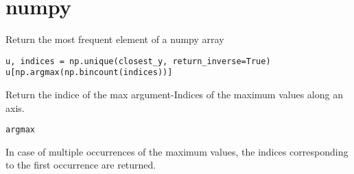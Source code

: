 \documentclass{article}           %
\begin{document}
\section{numpy}
Return the most frequent element of a numpy array
\begin{verbatim}
u, indices = np.unique(closest_y, return_inverse=True)
u[np.argmax(np.bincount(indices))]
\end{verbatim}
Return the indice of the max argument-Indices of the maximum values along an axis.
\begin{verbatim}
argmax
\end{verbatim}
In case  of multiple  occurrences of the  maximum values,  the indices
corresponding to the first occurrence are returned.\\
\end{document}
